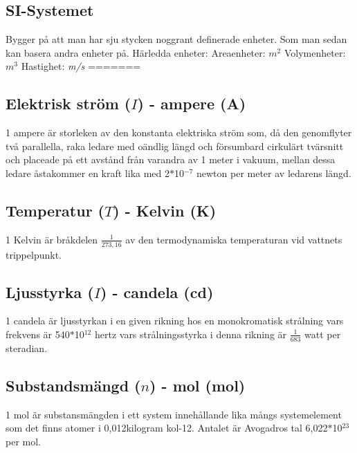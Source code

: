 \documentclass[a4paper,11pt]{article}
\begin{document}
\begin{flushleft}
\section{SI-Systemet}
Bygger på att man har sju stycken noggrant definerade enheter. Som man sedan kan basera andra enheter på.
\newline
Härledda enheter:\newline
Areaenheter: $ m^2 $\newline
Volymenheter: $ m^3 $\newline
Hastighet:  \textit{m/s}\newline
=======
\subsection{Elektrisk ström ($I$) - ampere (A)}
1 ampere är storleken av den konstanta elektriska ström som, då den genomflyter två parallella, raka ledare med oändlig längd och försumbard cirkulärt tvärsnitt och placeade på ett avstånd från varandra av 1 meter i vakuum, mellan dessa ledare åstakommer en kraft lika med 2$*$10$^{-7}$ newton per meter av ledarens längd.

\subsection{Temperatur ($T$) - Kelvin (K)}
1 Kelvin är bråkdelen $\frac{1}{273,16}$ av den termodynamiska temperaturan vid vattnets trippelpunkt.

\subsection{Ljusstyrka ($I$) - candela (cd)}
1 candela är ljusstyrkan i en given rikning hos en monokromatisk strålning vars frekvens är 540$*$10$^{12}$ hertz vars strålningsstyrka i denna rikning är $\frac{1}{683}$ watt per steradian.

\subsection{Substandsmängd ($n$) - mol (mol)}
1 mol är substansmängden i ett system innehållande lika mångs systemelement som det finns atomer i 0,012kilogram kol-12. Antalet är Avogadros tal 6,022$*$10$^{23}$ per mol.


\end{flushleft}
\end{document}

